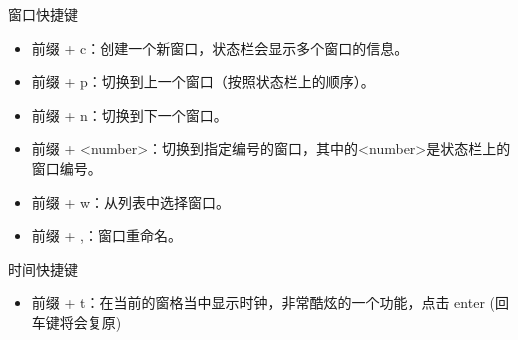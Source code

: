 窗口快捷键
\begin{itemize}
\item 前缀 + c：创建一个新窗口，状态栏会显示多个窗口的信息。
\item 前缀 + p：切换到上一个窗口（按照状态栏上的顺序）。
\item 前缀 + n：切换到下一个窗口。
\item 前缀 + <number>：切换到指定编号的窗口，其中的<number>是状态栏上的窗口编号。
\item 前缀 + w：从列表中选择窗口。
\item 前缀 + ,：窗口重命名。
\end{itemize}

时间快捷键
\begin{itemize}
\item 前缀 + t：在当前的窗格当中显示时钟，非常酷炫的一个功能，点击 enter (回车键将会复原)
\end{itemize}

